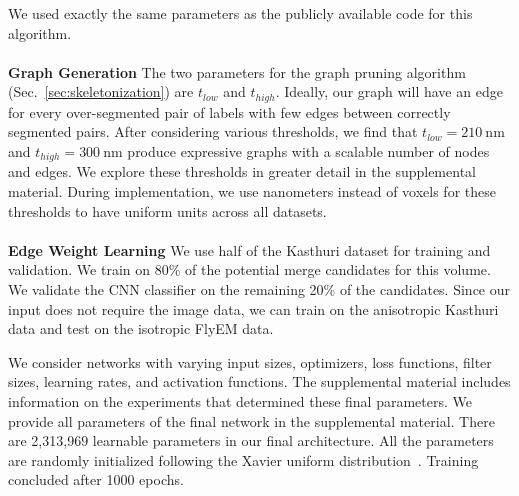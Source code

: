 We used exactly the same parameters as the publicly available code for this algorithm.
\\~\\
\noindent\textbf{Graph Generation}
The two parameters for the graph pruning algorithm (Sec.~\ref{sec:skeletonization}) are $t_{low}$ and $t_{high}$. 
Ideally, our graph will have an edge for every over-segmented pair of labels with few edges between correctly segmented pairs. 
After considering various thresholds, we find that $t_{low} = \SI{210}{\nano\meter}$ and $t_{high} = \SI{300}{\nano\meter}$ produce expressive graphs with a scalable number of nodes and edges.
We explore these thresholds in greater detail in the supplemental material.
During implementation, we use nanometers instead of voxels for these thresholds to have uniform units across all datasets.
\\~\\
\noindent\textbf{Edge Weight Learning}
\label{sec:network-parameters}
We use half of the Kasthuri dataset for training and validation. 
We train on 80\% of the potential merge candidates for this volume.
We validate the CNN classifier on the remaining 20\% of the candidates. 
Since our input does not require the image data, we can train on the anisotropic Kasthuri data and test on the isotropic FlyEM data.

We consider networks with varying input sizes, optimizers, loss functions, filter sizes, learning rates, and activation functions. 
The supplemental material includes information on the experiments that determined these final parameters. 
We provide all parameters of the final network in the supplemental material. 
There are 2,313,969 learnable parameters in our final architecture. 
All the parameters are randomly initialized following the Xavier uniform distribution~\cite{glorot2010understanding}. 
Training concluded after 1000 epochs.


